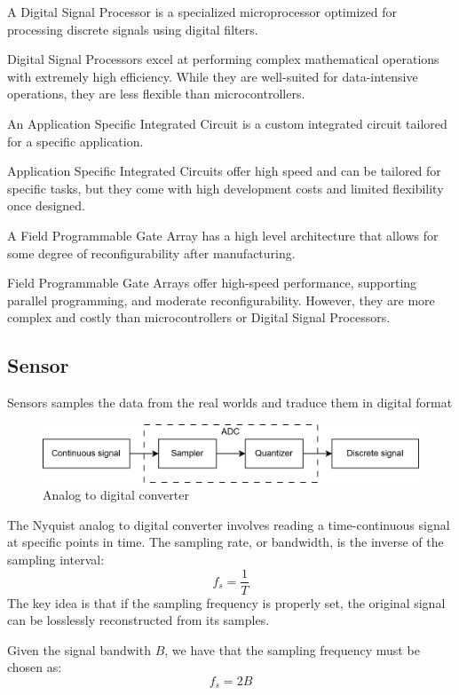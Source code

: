 \begin{definition}
    A Digital Signal Processor is a specialized microprocessor optimized for processing discrete signals using digital filters.
\end{definition}
\noindent Digital Signal Processors excel at performing complex mathematical operations with extremely high efficiency. 
While they are well-suited for data-intensive operations, they are less flexible than microcontrollers.

\begin{definition}
    An Application Specific Integrated Circuit is a custom integrated circuit tailored for a specific application.
\end{definition}
\noindent Application Specific Integrated Circuits offer high speed and can be tailored for specific tasks, but they come with high development costs and limited flexibility once designed.

\begin{definition}
    A Field Programmable Gate Array has a high level architecture that allows for some degree of reconfigurability after manufacturing.
\end{definition}
\noindent Field Programmable Gate Arrays offer high-speed performance, supporting parallel programming, and moderate reconfigurability. 
However, they are more complex and costly than microcontrollers or Digital Signal Processors.

\subsection{Sensor}
Sensors samples the data from the real worlds and traduce them in digital format
\begin{figure}[H]
    \centering
    \includegraphics[width=0.75\linewidth]{images/iot2.png}
    \caption{Analog to digital converter}
\end{figure}

The Nyquist analog to digital converter involves reading a time-continuous signal at specific points in time. 
The sampling rate, or bandwidth, is the inverse of the sampling interval:
\[f_s=\dfrac{1}{T}\]
\noindent The key idea is that if the sampling frequency is properly set, the original signal can be losslessly reconstructed from its samples.
\begin{theorem}
    Given the signal bandwith $B$, we have that the sampling frequency must be chosen as:
    \[f_s=2B\]
\end{theorem}

